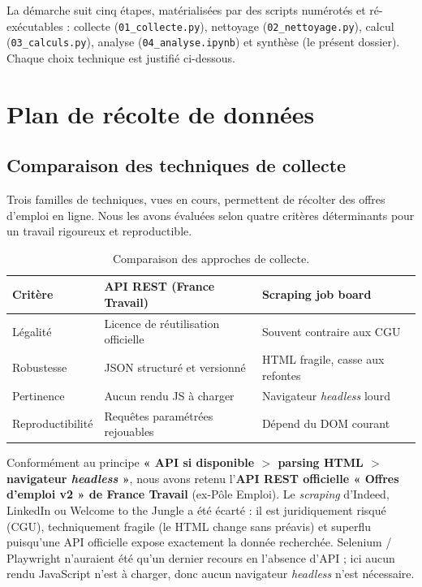 \documentclass[11pt,a4paper]{article}
\begin{document}
La démarche suit cinq étapes, matérialisées par des scripts numérotés et
ré-exécutables : collecte (\texttt{01\_collecte.py}), nettoyage
(\texttt{02\_nettoyage.py}), calcul (\texttt{03\_calculs.py}), analyse
(\texttt{04\_analyse.ipynb}) et synthèse (le présent dossier). Chaque choix
technique est justifié ci-dessous.

\section{Plan de récolte de données}
\label{sec:collecte}

\subsection{Comparaison des techniques de collecte}

Trois familles de techniques, vues en cours, permettent de récolter des offres
d'emploi en ligne. Nous les avons évaluées selon quatre critères déterminants
pour un travail rigoureux et reproductible.

\begin{table}[h]
\centering
\small
\begin{tabular}{>{\raggedright}p{3cm}p{4.4cm}p{4.4cm}}
\toprule
\textbf{Critère} & \textbf{API REST (France Travail)} & \textbf{Scraping job board} \\
\midrule
Légalité & Licence de réutilisation officielle & Souvent contraire aux CGU \\
Robustesse & JSON structuré et versionné & HTML fragile, casse aux refontes \\
Pertinence & Aucun rendu JS à charger & Navigateur \emph{headless} lourd \\
Reproductibilité & Requêtes paramétrées rejouables & Dépend du DOM courant \\
\bottomrule
\end{tabular}
\caption{Comparaison des approches de collecte.}
\end{table}

Conformément au principe \textbf{« API si disponible $>$ parsing HTML $>$
navigateur \emph{headless} »}, nous avons retenu l'\textbf{API REST officielle
« Offres d'emploi v2 » de France Travail} (ex-Pôle Emploi). Le \emph{scraping}
d'Indeed, LinkedIn ou Welcome to the Jungle a été écarté : il est juridiquement
risqué (CGU), techniquement fragile (le HTML change sans préavis) et superflu
puisqu'une API officielle expose exactement la donnée recherchée. Selenium /
Playwright n'auraient été qu'un dernier recours en l'absence d'API ; ici aucun
rendu JavaScript n'est à charger, donc aucun navigateur \emph{headless} n'est
nécessaire.
\end{document}
